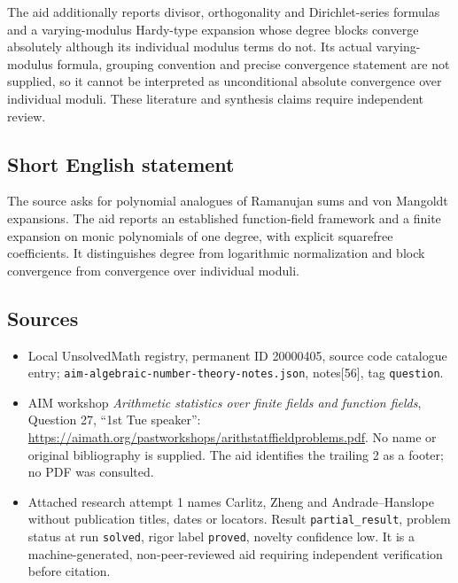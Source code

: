 \documentclass[11pt]{article}
\begin{document}
The aid additionally reports divisor, orthogonality and Dirichlet-series formulas and a varying-modulus Hardy-type expansion whose degree blocks converge absolutely although its individual modulus terms do not. Its actual varying-modulus formula, grouping convention and precise convergence statement are not supplied, so it cannot be interpreted as unconditional absolute convergence over individual moduli. These literature and synthesis claims require independent review.
\subsection{Short English statement}
The source asks for polynomial analogues of Ramanujan sums and von Mangoldt expansions. The aid reports an established function-field framework and a finite expansion on monic polynomials of one degree, with explicit squarefree coefficients. It distinguishes degree from logarithmic normalization and block convergence from convergence over individual moduli.
\subsection{Sources}
\begin{itemize}
\item Local UnsolvedMath registry, permanent ID 20000405, source code catalogue entry; \texttt{aim-algebraic-number-theory-notes.json}, notes[56], tag \texttt{question}.
\item AIM workshop \emph{Arithmetic statistics over finite fields and function fields}, Question 27, ``1st Tue speaker'': \url{https://aimath.org/pastworkshops/arithstatffieldproblems.pdf}. No name or original bibliography is supplied. The aid identifies the trailing 2 as a footer; no PDF was consulted.
\item Attached research attempt 1 names Carlitz, Zheng and Andrade--Hanslope without publication titles, dates or locators. Result \texttt{partial\_result}, problem status at run \texttt{solved}, rigor label \texttt{proved}, novelty confidence low. It is a machine-generated, non-peer-reviewed aid requiring independent verification before citation.
\end{itemize}
\end{document}
